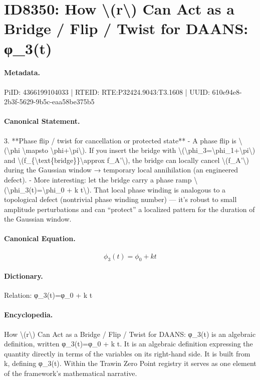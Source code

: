\section*{ID8350: How \textbackslash{}(r\textbackslash{}) Can Act as a Bridge / Flip / Twist for DAANS: φ\_3(t)}
\paragraph{Metadata.}
PiID: 4366199104033 | RTEID: RTE:P32424.9043:T3.1608 | UUID: 610e94e8-2b3f-5629-9b5c-eaa58be375b5

\paragraph{Canonical Statement.}
3. **Phase flip / twist for cancellation or protected state** - A phase flip is \textbackslash{}(\textbackslash{}phi \textbackslash{}mapsto \textbackslash{}phi+\textbackslash{}pi\textbackslash{}). If you insert the bridge with \textbackslash{}(\textbackslash{}phi\_3=\textbackslash{}phi\_1+\textbackslash{}pi\textbackslash{}) and \textbackslash{}(f\_\{\textbackslash{}text\{bridge\}\}\textbackslash{}approx f\_A'\textbackslash{}), the bridge can locally cancel \textbackslash{}(f\_A'\textbackslash{}) during the Gaussian window → temporary local annihilation (an engineered defect). - More interesting: let the bridge carry a phase ramp \textbackslash{}(\textbackslash{}phi\_3(t)=\textbackslash{}phi\_0 + k t\textbackslash{}). That local phase winding is analogous to a topological defect (nontrivial phase winding number) — it’s robust to small amplitude perturbations and can “protect” a localized pattern for the duration of the Gaussian window.

\paragraph{Canonical Equation.}
\[
\phi_3(t)=\phi_0 + k t
\]

\paragraph{Dictionary.}
Relation: φ\_3(t)=φ\_0 + k t

\paragraph{Encyclopedia.}
How \textbackslash{}(r\textbackslash{}) Can Act as a Bridge / Flip / Twist for DAANS: φ\_3(t) is an algebraic definition, written φ\_3(t)=φ\_0 + k t. It is an algebraic definition expressing the quantity directly in terms of the variables on its right-hand side. It is built from k, defining φ\_3(t). Within the Trawin Zero Point registry it serves as one element of the framework's mathematical narrative.
